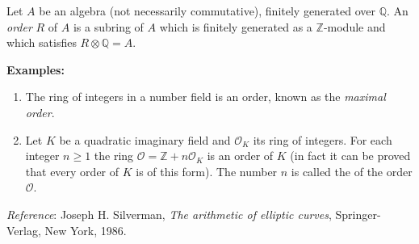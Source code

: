 \documentclass[12pt]{article}
\begin{document}
Let $A$ be an algebra (not necessarily commutative), finitely generated over
$\mathbb{Q}$. An {\it order} $R$ of $A$ is a subring
of $A$ which is finitely generated as a
$\mathbb{Z}$-module and which satisfies $R \otimes \mathbb{Q}= A$.

{\bf Examples:}
\begin{enumerate}
\item The ring of integers in a number field is an order, known as
the {\it maximal order}.

\item Let $K$ be a quadratic imaginary field and $\mathcal{O}_K$ its
ring of integers. For each integer $n\geq 1$ the ring
$\mathcal{O}={\mathbb{Z}}+n\mathcal{O}_K$ is an order of $K$ (in fact it can be
proved that every order of $K$ is of this form). The number $n$ is called the {\it {}} of the order $\mathcal{O}$.
\end{enumerate}

{\it Reference}: Joseph H. Silverman, {\it The arithmetic of
elliptic curves}, Springer-Verlag, New York, 1986.
\end{document}
